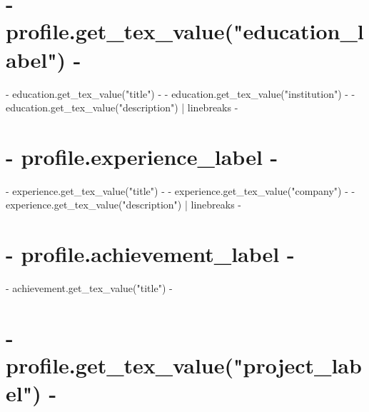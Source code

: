 \documentclass[letterpaper]{twentysecondcv-alice} %
\begin{document}
{{{{{{{{{{\section{ {{- profile.get_tex_value("education_label") -}} }
{%
\begin{twenty} %
  { {{- education.get_tex_value("title") -}} }
  { {{- education.get_tex_value("institution") -}} }
  { {{- education.get_tex_value("description") | linebreaks -}}  }
\end{twenty}
{%
{%
{%
\section{ {{- profile.experience_label -}} }
{%
\begin{twenty} %
  { {{- experience.get_tex_value("title") -}} }
  { {{- experience.get_tex_value("company") -}} }
  { {{- experience.get_tex_value("description") | linebreaks -}}  }
\end{twenty}
{%
{%
{%
\section{ {{- profile.achievement_label -}} }
{%
\begin{twenty}
  { {{- achievement.get_tex_value("title") -}} }
\end{twenty}
{%
{%
{%
\section{ {{- profile.get_tex_value("project_label") -}} }
{%
{%
}}}}}}}}}}}}}}}}}}}}}}}}
\end{document}
